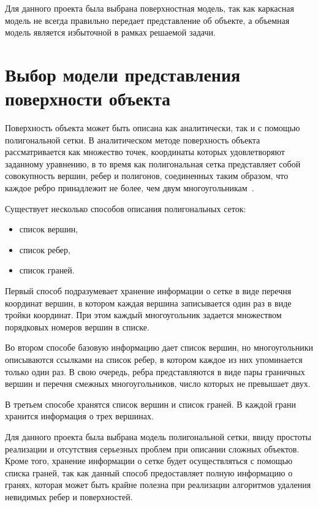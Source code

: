 Для данного проекта была выбрана поверхностная модель, так как каркасная модель не всегда правильно передает представление об объекте, а объемная модель является избыточной в рамках решаемой задачи.

\section{Выбор модели представления поверхности объекта}

Поверхность объекта может быть описана как аналитически, так и с помощью полигональной сетки. В аналитическом методе поверхность объекта рассматривается как множество точек, координаты которых удовлетворяют заданному уравнению, в то время как полигональная сетка представляет собой совокупность вершин, ребер и полигонов, соединенных таким образом, что каждое ребро принадлежит не более, чем двум многоугольникам~\cite{bojko}.

Существует несколько способов описания полигональных сеток:

\begin{itemize}
	\item список вершин,
	\item список ребер,
	\item список граней.
\end{itemize}

Первый способ подразумевает хранение информации о сетке в виде перечня координат вершин, в котором каждая вершина записывается один раз в виде тройки координат. При этом каждый многоугольник задается множеством порядковых номеров вершин в списке.

Во втором способе базовую информацию дает список вершин, но многоугольники описываются ссылками на список ребер, в котором каждое из них упоминается только один раз. В свою очередь, ребра представляются в виде пары граничных вершин и перечня смежных многоугольников, число которых не превышает двух.

В третьем способе хранятся список вершин и список граней. В каждой грани хранится информация о трех вершинах.

Для данного проекта была выбрана модель полигональной сетки, ввиду простоты реализации и отсутствия серьезных проблем при описании сложных объектов. Кроме того, хранение информации о сетке будет осуществляться с помощью списка граней, так как данный способ предоставляет полную информацию о гранях, которая может быть крайне полезна при реализации алгоритмов удаления невидимых ребер и поверхностей.

